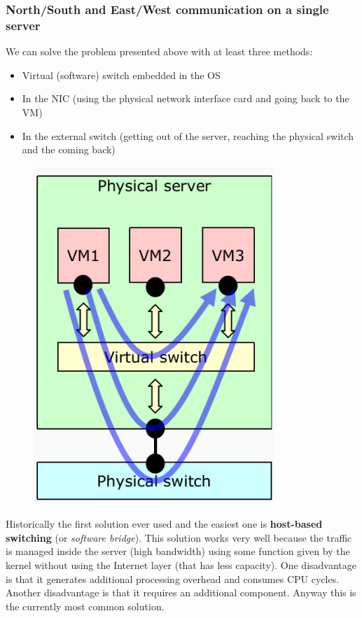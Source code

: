     
    \subsubsection{North/South and East/West communication on a single server}
        \FloatBarrier
        We can solve the problem presented above with at least three methods:
        \begin{itemize}
            \item Virtual (software) switch embedded in the OS
            \item In the NIC (using the physical network interface card and going back to the VM)
            \item In the external switch (getting out of the server, reaching the physical switch and the coming back)
        \end{itemize}   
        \begin{figure}[h!]
            \centering
            \includegraphics[scale=0.25]{images/virtserver.png}
        \end{figure}
        \FloatBarrier

        
            Historically the first solution ever used and the easiest one is \textbf{host-based switching} (or \textit{software bridge}). This solution works very well because the traffic is managed inside the server (high bandwidth) using some function given by the kernel without using the Internet layer (that has less capacity).
            One disadvantage is that it generates additional processing overhead and consumes CPU cycles. Another disadvantage is that it requires an additional component.
            Anyway this is the currently most common solution.
            
